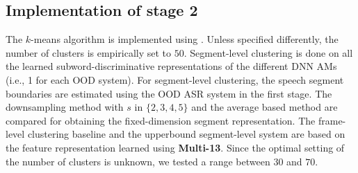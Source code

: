 \documentclass[a4paper]{article}
\begin{document}



\subsection{Implementation of stage 2}
\label{subsec:setup_stage2}

The $k$-means algorithm is implemented using \cite{scikit-learn}. 
Unless specified differently, the number of clusters is empirically set to $50$.
Segment-level clustering is done on all the learned subword-discriminative representations of the different DNN AMs  (i.e., 1 for each OOD system). 
For segment-level clustering, the speech segment boundaries are estimated using the OOD ASR system in the first stage. 
The downsampling method with $s$ in $\{2,3,4,5\}$ and the average based method are compared for obtaining the fixed-dimension segment  representation. 
The frame-level clustering baseline and the upperbound segment-level system are based on the feature representation  learned using \textbf{Multi-13}. Since the optimal setting of the number of clusters is unknown, we tested a range between $30$ and $70$. 



\end{document}
